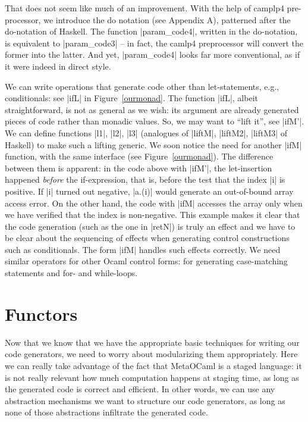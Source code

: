 \documentclass{llncs}
\begin{document}
That does not seem like much of an improvement. With the help of
camplp4 pre-processor, we introduce the do notation (see
Appendix A), patterned after the
do-notation of Haskell. The function |param_code4|, written in
the do-notation, is equivalent to |param_code3| -- in fact, the camlp4
preprocessor will convert the former into the latter. And yet,
|param_code4| looks far more conventional, as if it were indeed in
direct style.

We can write operations that generate code other than let-statements,
e.g., conditionals: see |ifL| in Figure~\ref{ourmonad}. The function |ifL|, 
albeit straightforward, is not as general as we wish: its argument are
already generated pieces of code rather than monadic values. So, we
may want to ``lift it'', see |ifM'|. We can define functions |l1|,
|l2|, |l3| (analogues of |liftM|, |liftM2|, |liftM3| of Haskell) 
to make such a lifting generic.
We soon notice the need for another |ifM| function, with the same
interface (see Figure~\ref{ourmonad}). The difference between them is
apparent: in the code above with |ifM'|, the let-insertion
happened \emph{before} the if-expression, that is, before the test that
the index |i| is positive. If |i| turned out
negative, |a.(i)| would generate an out-of-bound array access
error. On the other hand, the code with |ifM| accesses the array only
when we have verified that the index is non-negative. This example
makes it clear that the code generation (such as the one in |retN|) is 
truly an effect and we have to be clear about the sequencing of
effects when generating control constructions such as conditionals.
The form |ifM| handles such effects correctly. We
need similar operators for other Ocaml control forms: for generating
case-matching statements and for- and while-loops.

\section{Functors}\label{functors}

Now that we know that we have the appropriate basic techniques for
writing our code generators, we need to worry about modularizing them
appropriately.  Here we can really take advantage of the fact that
MetaOCaml is a staged language: it is not really relevant how much
computation happens at staging time, as long as the generated code
is correct and efficient.  In other words, we can use any abstraction
mechanisms we want to structure our code generators, as long as none
of those abstractions infiltrate the generated code.
\end{document}
